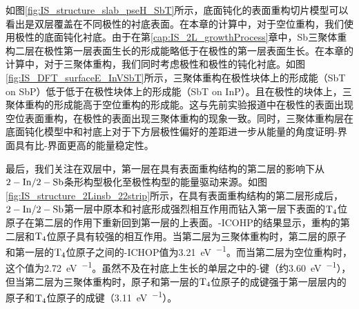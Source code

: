 如图\ref{fig:IS_structure_slab_pseH_SbT}所示，底面钝化的表面重构切片模型可以看出是双层覆盖在不同极性的衬底表面。在本章的计算中，对于空位重构，我们使用极性的底面钝化衬底。由于在第\ref{cap:IS_2L_growthProcess}章中，{Sb}三聚体重构二层在极性第一层表面生长的形成能略低于在极性的第一层表面生长。在本章的计算中，对于三聚体重构，我们同时考虑极性和极性的钝化衬底。如图\ref{fig:IS_DFT_surfaceE_InVSbT}所示，三聚体重构在极性块体上的形成能（SbT on SbP）低于低于在极性块体上的形成能（SbT on InP）。且在极性的块体上，三聚体重构的形成能高于空位重构的形成能。这与先前实验报道中在极性的表面出现空位表面重构，在极性的表面出现三聚体重构的现象一致。同时，三聚体重构层在底面钝化模型中和衬底上对于下方层极性偏好的差距进一步从能量的角度证明-界面具有比-界面更高的能量稳定性。

最后，我们关注在双层中，第一层在具有表面重构结构的第二层的影响下从$\rm 2-In/2-Sb$条形构型极化至极性构型的能量驱动来源。如图\ref{fig:IS_structure_2Linsb_22strip}所示，在具有表面重构结构的第二层形成后，$\rm 2-In/2-Sb$第一层中原本和衬底形成强烈相互作用而钻入第一层下表面的$\rm T_{4} \it$位原子在第二层的作用下重新回到第一层的上表面。-ICOHP的结果显示，重构的第二层和$\rm T_{4} \it$位原子具有较强的相互作用。当第二层为三聚体重构时，第二层的原子和第一层的$\rm T_{4} \it$位原子之间的-ICHOP值为\SI{3.21}{\electronvolt\per\pair}。而当第二层为空位重构时，这个值为\SI{2.72}{\electronvolt\per\pair}。虽然不及在衬底上生长的单层之中的-键（约\SI{3.60}{\electronvolt\per\pair}），但当第二层为三聚体重构时，原子和第一层的$\rm T_{4} \it$位原子的成键强于第一层层内的原子和$\rm T_{4} \it$位原子的成键（\SI{3.11}{\electronvolt\per\pair}）。

